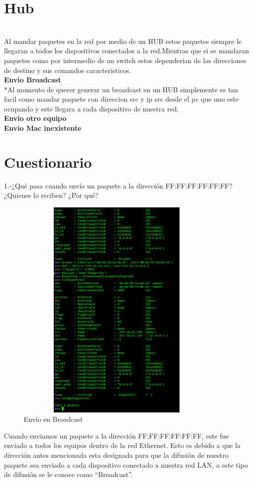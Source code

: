 \documentclass{udpreport}
\begin{document}
	\section{Hub}\\
	 	Al mandar paquetes en la red por medio de un HUB estos paquetes siempre 
 		le llegaran a todos los dispositivos conectados a la red.Mientras que si
 		se mandaran paquetes como por intermedio de un switch estos dependerian de 
 		las direcciones de destino  y sus comandos caracteristicos.\\
 		{\bf \large Envio Broadcast}\\
 		*Al momento de querer generar un broadcast en un HUB simplemente es tan facil como mandar
		paquete con direccion src y ip src desde el pc que uno este ocupando y este llegara a cada
 		dispositivo de nuestra red.\\
 		{\bf \large Envio  otro equipo}\\
 		{\bf \large Envio Mac inexistente}\\


	\section{Cuestionario}
	
	  1.-¿Qué pasa cuando envío un paquete a la dirección FF:FF:FF:FF:FF:FF? ¿Quienes
	     lo reciben? ¿Por qué?\\
    	 	\begin{figure}[H]
	        	\centering
	        	\includegraphics[width=10cm, height=11cm]{EnvioPaquetito.png}
			\caption{Envío en Broadcast}
	 	\end{figure}
	     Cuando enviamos un paquete a la dirección FF:FF:FF:FF:FF:FF, este fue enviado a todos los equipos dentro de la red
	     Ethernet. Esto es debido a que la dirección antes mencionada esta designada para que la difusión de nuestro paquete sea
 	     enviado a cada dispositivo conectado a nuestra red LAN, a este tipo de difusión se le conoce como “Broadcast”.\\
 
\end{document}
